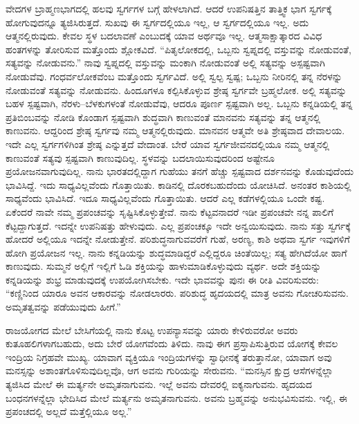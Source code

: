 \vskip 0.2cm 

ವೇದಗಳ ಬ್ರಾಹ್ಮಣಭಾಗದಲ್ಲಿ ಹಲವು ಸ್ವರ್ಗಗಳ ಬಗ್ಗೆ ಹೇಳಲಾಗಿದೆ. ಆದರೆ ಉಪನಿಷತ್ತಿನ ತಾತ್ತ್ವಿಕ ಭಾಗ ಸ್ವರ್ಗಕ್ಕೆ ಹೋಗುವುದನ್ನೂ ತ್ಯಜಿಸಿರುತ್ತದೆ. ಸುಖವು ಈ ಸ್ವರ್ಗದಲ್ಲಿಯೂ ಇಲ್ಲ, ಆ ಸ್ವರ್ಗದಲ್ಲಿಯೂ ಇಲ್ಲ. ಅದು ಆತ್ಮನಲ್ಲಿರುವುದು. ಕೇವಲ ಸ್ಥಳ ಬದಲಾವಣೆ ಎಂಬುದಕ್ಕೆ ಯಾವ ಅರ್ಥವೂ ಇಲ್ಲ. ಆತ್ಮಸಾಕ್ಷಾತ್ಕಾರದ ವಿವಿಧ ಹಂತಗಳನ್ನು ತೋರಿಸುವ ಮತ್ತೊಂದು ಶ್ಲೋಕವಿದೆ. “ಪಿತೃಲೋಕದಲ್ಲಿ, ಒಬ್ಬನು ಸ್ವಪ್ನದಲ್ಲಿ ವಸ್ತುವನ್ನು ನೋಡುವಂತೆ, ಸತ್ಯವನ್ನು ನೋಡುವನು.” ನಾವು ಸ್ವಪ್ನದಲ್ಲಿ ವಸ್ತುವನ್ನು ಮಂಕಾಗಿ ನೋಡುವಂತೆ ಅಲ್ಲಿ ಸತ್ಯವನ್ನು ಅಸ್ಪಷ್ಟವಾಗಿ ನೋಡುವೆವು. ಗಂಧರ್ವಲೋಕವೆಂಬ ಮತ್ತೊಂದು ಸ್ವರ್ಗವಿದೆ. ಅಲ್ಲಿ ಸ್ವಲ್ಪ ಸ್ವಷ್ಪ; ಒಬ್ಬನು ನೀರಿನಲ್ಲಿ ತನ್ನ ನೆರಳನ್ನು ನೋಡುವಂತೆ ಸತ್ಯವನ್ನು ನೋಡುವನು. ಹಿಂದೂಗಳೂ ಕಲ್ಪಿಸಿಕೊಳ್ಳುವ ಶ್ರೇಷ್ಠ ಸ್ವರ್ಗವೇ ಬ್ರಹ್ಮಲೋಕ. ಅಲ್ಲಿ ಸತ್ಯವನ್ನು ಬಹಳ ಸ್ಪಷ್ಟವಾಗಿ, ನೆರಳು–ಬೆಳಕುಗಳಂತೆ ನೋಡುವೆವು, ಆದರೂ ಪೂರ್ಣ ಸ್ಪಷ್ಟವಾಗಿ ಅಲ್ಲ. ಒಬ್ಬನು ಕನ್ನಡಿಯಲ್ಲಿ ತನ್ನ ಪ್ರತಿಬಿಂಬವನ್ನು ನೋಡಿ ಕೊಂಡಾಗ ಸ್ಪಷ್ಟವಾಗಿ ಶುದ್ಧವಾಗಿ ಕಾಣುವಂತೆ ಮಾನವನು ಸತ್ಯವನ್ನು ತನ್ನ ಆತ್ಮನಲ್ಲಿ ಕಾಣುವನು. ಆದ್ದರಿಂದ ಶ್ರೇಷ್ಠ ಸ್ವರ್ಗವು ನಮ್ಮ ಆತ್ಮನಲ್ಲಿರುವುದು. ಮಾನವನ ಆತ್ಮವೇ ಅತಿ ಶ್ರೇಷ್ಠವಾದ ದೇವಾಲಯ. ಇದೇ ಎಲ್ಲ ಸ್ವರ್ಗಗಳಿಗಿಂತ ಶ್ರೇಷ್ಠ ಎನ್ನುತ್ತದೆ ವೇದಾಂತ. ಬೇರೆ ಯಾವ ಸ್ವರ್ಗಜೀವನದಲ್ಲಿಯೂ ನಮ್ಮ ಆತ್ಮನಲ್ಲಿ ಕಾಣುವಂತೆ ಸತ್ಯವು ಸ್ಪಷ್ಟವಾಗಿ ಕಾಣುವುದಿಲ್ಲ. ಸ್ಥಳವನ್ನು ಬದಲಾಯಿಸುವುದರಿಂದ ಅಷ್ಟೇನೂ ಪ್ರಯೋಜನವಾಗುವುದಿಲ್ಲ. ನಾನು ಭಾರತದಲ್ಲಿದ್ದಾಗ ಗುಹೆಯು ತನಗೆ ಹೆಚ್ಚು ಸ್ಪಷ್ಟವಾದ ದರ್ಶನವನ್ನು ಕೊಡುವುದೆಂದು ಭಾವಿಸಿದ್ದೆ. ಇದು ಸಾಧ್ಯವಿಲ್ಲವೆಂದು ಗೊತ್ತಾಯಿತು. ಕಾಡಿನಲ್ಲಿ ದೊರಕಬಹುದೆಂದು ಯೋಚಿಸಿದೆ. ಅನಂತರ ಕಾಶಿಯಲ್ಲಿ ಸಾಧ್ಯವೆಂದು ಭಾವಿಸಿದೆ. ಇದೂ ಸಾಧ್ಯವಿಲ್ಲವೆಂದು ಗೊತ್ತಾಯಿತು. ಆದರೆ ಎಲ್ಲ ಕಡೆಗಳಲ್ಲಿಯೂ ಒಂದೇ ಕಷ್ಟ. ಏಕೆಂದರೆ ನಾವೇ ನಮ್ಮ ಪ್ರಪಂಚವನ್ನು ಸೃಷ್ಟಿಸಿಕೊಳ್ಳುತ್ತೇವೆ. ನಾನು ಕೆಟ್ಟವನಾದರೆ ಇಡೀ ಪ್ರಪಂಚವೇ ನನ್ನ ಪಾಲಿಗೆ ಕೆಟ್ಟದ್ದಾಗುತ್ತದೆ. ಇದನ್ನೇ ಉಪನಿಷತ್ತು ಹೇಳುವುದು. ಎಲ್ಲ ಪ್ರಪಂಚಕ್ಕೂ ಇದೇ ಅನ್ವಯಿಸುವುದು. ನಾನು ಸತ್ತು ಸ್ವರ್ಗಕ್ಕೆ ಹೋದರೆ ಅಲ್ಲಿಯೂ ಇದನ್ನೇ ನೋಡುತ್ತೇನೆ. ಪರಿಶುದ್ಧನಾಗುವವರೆಗೆ ಗುಹೆ, ಅರಣ್ಯ, ಕಾಶಿ ಅಥವಾ ಸ್ವರ್ಗ ಇವುಗಳಿಗೆ ಹೋಗಿ ಪ್ರಯೋಜನ ಇಲ್ಲ. ನಾನು ಕನ್ನಡಿಯನ್ನು ಶುದ್ಧಮಾಡಿದ್ದರೆ ಎಲ್ಲಿದ್ದರೂ ಚಿಂತೆಯಿಲ್ಲ; ಸತ್ಯ ಹೇಗಿದೆಯೋ ಹಾಗೆ ಕಾಣುವುದು. ಸುಮ್ಮನೆ ಅಲ್ಲಿಗೆ ಇಲ್ಲಿಗೆ ಓಡಿ ಶಕ್ತಿಯನ್ನು ಹಾಳುಮಾಡಿಕೊಳ್ಳುವುದು ವ್ಯರ್ಥ. ಅದೇ ಶಕ್ತಿಯನ್ನು ಕನ್ನಡಿಯನ್ನು ಶುಭ್ರ ಮಾಡುವುದಕ್ಕೆ ಉಪಯೋಗಿಸಬೇಕು. ಇದೇ ಭಾವವನ್ನು ಪುನಃ ಈ ರೀತಿ ವಿವರಿಸುವರು: “ಕಣ್ಣಿನಿಂದ ಯಾರೂ ಅವನ ಆಕಾರವನ್ನು ನೋಡಲಾರರು. ಪರಿಶುದ್ಧ ಹೃದಯದಲ್ಲಿ ಮಾತ್ರ ಅವನು ಗೋಚರಿಸುವನು. ಅಮೃತತ್ವವನ್ನು ಪಡೆಯುವುದು ಹೀಗೆ.”

\vskip 0.2cm 

ರಾಜಯೋಗದ ಮೇಲೆ ಬೇಸಿಗೆಯಲ್ಲಿ ನಾನು ಕೊಟ್ಟ ಉಪನ್ಯಾಸವನ್ನು ಯಾರು ಕೇಳಿರುವರೋ ಅವರು ಕುತೂಹಲಿಗಳಾಗಬಹುದು, ಅದು ಬೇರೆ ಯೋಗವೆಂದು ತಿಳಿದು. ನಾವು ಈಗ ಪ್ರಸ್ತಾಪಿಸುತ್ತಿರುವ ಯೋಗಕ್ಕೆ ಕೇವಲ ಇಂದ್ರಿಯ ನಿಗ್ರಹವೇ ಮುಖ್ಯ. ಯಾವಾಗ ವ್ಯಕ್ತಿಯೂ ಇಂದ್ರಿಯಗಳನ್ನು ಸ್ವಾಧೀನಕ್ಕೆ ತರುತ್ತಾನೋ, ಯಾವಾಗ ಅವು ಮನಸ್ಸನ್ನು ಅಶಾಂತಗೊಳಿಸುವುದಿಲ್ಲವೊ, ಆಗ ಅವನು ಗುರಿಯನ್ನು ಸೇರುವನು. “ಮನಸ್ಸಿನ ಕ್ಷುದ್ರ ಆಸೆಗಳನ್ನೆಲ್ಲಾ ತ್ಯಜಿಸಿದ ಮೇಲೆ ಈ ಮರ್ತ್ಯನೇ ಅಮೃತನಾಗುವನು. ಇಲ್ಲೆ ಅವನು ದೇವರಲ್ಲಿ ಐಕ್ಯನಾಗುವನು. ಹೃದಯದ ಬಂಧನಗಳನ್ನೆಲ್ಲಾ ಭೇದಿಸಿದ ಮೇಲೆ ಮರ್ತ್ಯನು ಅಮೃತನಾಗುವನು. ಅವನು ಬ್ರಹ್ಮವನ್ನು ಅನುಭವಿಸುವನು. ಇಲ್ಲಿ, ಈ ಪ್ರಪಂಚದಲ್ಲಿ ಅಲ್ಲದೆ ಮತ್ತೆಲ್ಲಿಯೂ ಅಲ್ಲ.”

